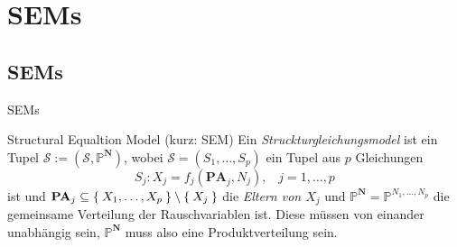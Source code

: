 \section{SEMs}
\subsection{SEMs}
\begin{frame}{SEMs}
    \begin{block}{Structural Equaltion Model (kurz: SEM)}
        Ein \textit{Struckturgleichungsmodel} ist ein Tupel
        $\mathcal{S} := (\mathcal{S}, \mathbb{P}^\mathbf{N})$, wobei
        $\mathcal{S} = (S_1, \dots, S_p)$ ein Tupel aus $p$ Gleichungen
        \[S_j : X_j = f_j(\mathbf{PA}_j, N_j), \;\;\; j=1, \dots, p\]
        ist und $\mathbf{PA}_j \subseteq \Set{X_1, \dots, X_p} \setminus \Set{X_j}$
        die \textit{Eltern von $X_j$} und $\mathbb{P}^\mathbf{N} = \mathbb{P}^{N_1, \dots, N_p}$
        die gemeinsame Verteilung der Rauschvariablen ist. Diese müssen
        von einander unabhängig sein, $\mathbb{P}^\mathbf{N}$ muss also eine
        Produktverteilung sein.
    \end{block}
\end{frame}
